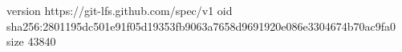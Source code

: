 version https://git-lfs.github.com/spec/v1
oid sha256:2801195dc501e91f05d19353fb9063a7658d9691920e086e3304674b70ac9fa0
size 43840
